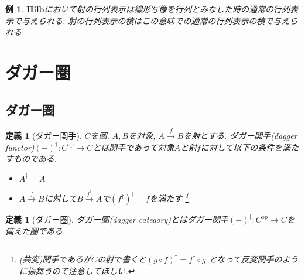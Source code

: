 \documentclass[a4paper,12pt]{ltjsarticle}
\theoremstyle{break}
\newtheorem{defn}[thm]{定義}
\newtheorem{eg}[thm]{例}
\newtheorem{thrm}[thm]{定理}
\newtheorem*{prf}{証明}
\newcommand{\hilb}{\mathbf{Hilb}}
\newcommand{\Hom}{\mathrm{Hom}}
\newcommand{\Op}{\mathrm{op}}
\newcommand{\xr}[1]{\xrightarrow{#1}}
\newcommand{\ci}{\circ}
\newcommand{\da}{\dagger}
\newcommand{\opl}{\oplus}
\numberwithin{equation}{section}
\begin{document}
\begin{eg}
  $\hilb$において射の行列表示は線形写像を行列とみなした時の通常の行列表示で与えられる. 
  射の行列表示の積はこの意味での通常の行列表示の積で与えられる. 
\end{eg}




\newpage

\section{ダガー圏}

\subsection{ダガー圏}

\begin{defn}[ダガー関手]
  $C$を圏, $A,B$を対象, $A \xr{f} B$を射とする.  
  ダガー関手(dagger functor)$(-)^\da: C^{\Op} \to C$とは関手であって対象$A$と射$f$に対して以下の条件を満たすものである. 
  \begin{itemize}
    \item $A^\da = A$
    \item $A \xr{f} B$に対して$B \xr{f^\da} A$で$(f^\da)^\da = f$を満たす
    \footnote{
      (共変)関手であるが$C$の射で書くと$(g \ci f)^\da = f^\da \ci g^\da$となって反変関手のように振舞うので注意してほしい. 
    }
  \end{itemize}
\end{defn}

\begin{defn}[ダガー圏]
  ダガー圏(dagger category)とはダガー関手$(-)^\da: C^{\Op} \to C$を備えた圏である. 
\end{defn} 
\end{document}
